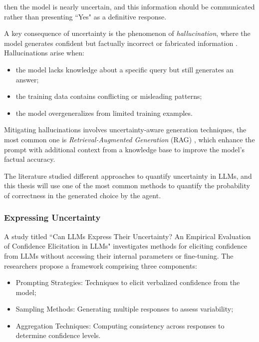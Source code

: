 then the model is nearly uncertain, and this information should be communicated rather
than presenting ``Yes" as a definitive response.

A key consequence of uncertainty is the phenomenon of \emph{hallucination},
where the model generates confident but factually incorrect or fabricated
information \cite{Ji_2023}. Hallucinations arise when:
\begin{itemize}
  \item the model lacks knowledge about a specific query but still generates an answer;

  \item the training data contains conflicting or misleading patterns;

  \item the model overgeneralizes from limited training examples.
\end{itemize}

Mitigating hallucinations involves uncertainty-aware generation techniques, the
most common one is \emph{Retrieval-Augmented Generation} (RAG) \cite{lewis2021retrievalaugmentedgenerationknowledgeintensivenlp},
which enhance the prompt with additional context from a knowledge base to
improve the model's factual accuracy.

The literature studied different approaches to quantify uncertainty in LLMs, and
this thesis will use one of the most common methods to quantify the probability of
correctness in the generated choice by the agent.

\subsubsection{Expressing Uncertainty}
A study titled ``Can LLMs Express Their Uncertainty? An Empirical Evaluation of
Confidence Elicitation in LLMs" \cite{xiong2024llmsexpressuncertaintyempirical} investigates
methods for eliciting confidence from LLMs without accessing their internal parameters
or fine-tuning. The researchers propose a framework comprising three components:
\begin{itemize}
  \item Prompting Strategies: Techniques to elicit verbalized confidence from
    the model;

  \item Sampling Methods: Generating multiple responses to assess variability;

  \item Aggregation Techniques: Computing consistency across responses to
    determine confidence levels.
\end{itemize}

